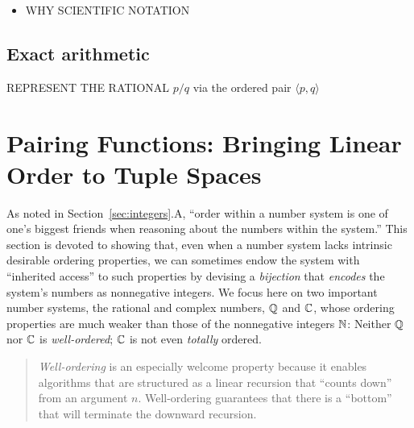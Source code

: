 \begin{itemize}
\item
WHY SCIENTIFIC NOTATION
\end{itemize}

\subsection{Exact arithmetic}

REPRESENT THE RATIONAL $p/q$ via the ordered pair $\langle p,q \rangle$


\section{Pairing Functions: Bringing Linear Order to Tuple Spaces}

As noted in Section~\ref{sec:integers}.A, ``order within a number
system is one of one's biggest friends when reasoning about the
numbers within the system.''  This section is devoted to showing that,
even when a number system lacks intrinsic desirable ordering
properties, we can sometimes endow the system with ``inherited
access'' to such properties by devising a {\em bijection} that {\it
  encodes}
%
the system's numbers as nonnegative integers.  We focus here on two
important number systems, the rational and complex numbers, $\mathbb{Q}$ and
$\mathbb{C}$, whose ordering properties are much weaker than those of the
nonnegative integers $\mathbb{N}$: Neither $\mathbb{Q}$ nor $\mathbb{C}$ is {\em
  well-ordered}; $\mathbb{C}$ is not even {\em totally} ordered.
\begin{quote}
{\em Well-ordering} is an especially welcome property because it
enables algorithms that are structured as a linear recursion that
``counts down'' from an argument $n$.  Well-ordering guarantees that
there is a ``bottom'' that will terminate the downward recursion.
\end{quote}

